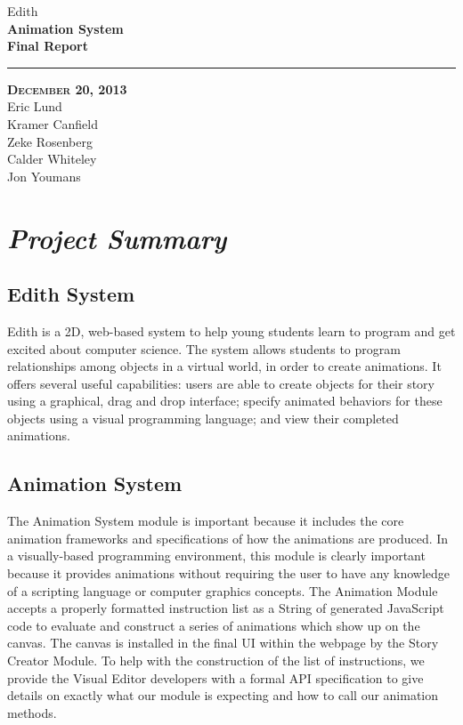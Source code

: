 \documentclass[12pt]{article}
\begin{document}
\begin{titlepage}
	\begin{center}
	\huge  Edith \\
	\vspace*{\fill}%
 	\huge \textbf{Animation System \\Final Report}
	\bigskip 
	\rule{130mm}{.1pt}
	\textsc{\textbf{December 20, 2013} \\ }
	\vspace*{\fill}%
	Eric Lund \\
	Kramer Canfield \\ 
	Zeke Rosenberg \\
	Calder Whiteley \\
	Jon Youmans
	\end{center}
\end{titlepage}

\section{\emph{\Large Project Summary}}%
\subsection{Edith System}
\begin{changemargin}{1cm}{0cm} 
Edith is a 2D, web-based system to help young students learn to program and get excited about computer science. The system allows students to program relationships among objects in a virtual world, in order to create animations. It offers several useful capabilities: users are able to create objects for their story using a graphical, drag and drop interface; specify animated behaviors for these objects using a visual programming language; and view their completed animations.

\end{changemargin} 
\subsection{Animation System}
\begin{changemargin}{1cm}{0cm} 
The Animation System module is important because it includes the core animation frameworks and specifications of how the animations are produced. In a visually-based programming environment, this module is clearly important because it provides animations without requiring the user to have any knowledge of a scripting language or computer graphics concepts. The Animation Module accepts a properly formatted instruction list as a String of generated JavaScript code to evaluate and construct a series of animations which show up on the canvas. The canvas is installed in the final UI within the webpage by the Story Creator Module. To help with the construction of the list of instructions, we provide the Visual Editor developers with a formal API specification to give details on exactly what our module is expecting and how to call our animation methods.
\end{changemargin} 
\end{document}
